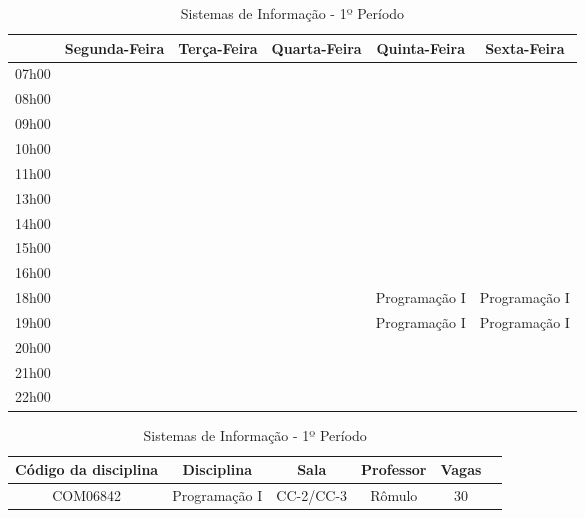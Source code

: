 \begin{apendices}
\begin{table}[!h]
\begin{adjustbox}{width=1\textwidth,center=\textwidth}
\centering
\begin{tabular}{|c|c|c|c|c|c|}
\hline
 & Segunda-Feira & Terça-Feira & Quarta-Feira & Quinta-Feira & Sexta-Feira \\ \hline
07h00 &  &  &  &  &  \\ \hline
08h00 &  &  &  &  &  \\ \hline
09h00 &  &  &  &  &  \\ \hline
10h00 &  &  &  &  &  \\ \hline
11h00 &  &  &  &  &  \\ \hline
13h00 &  &  &  &  &  \\ \hline
14h00 &  &  &  &  &  \\ \hline
15h00 &  &  &  &  &  \\ \hline
16h00 &  &  &  &  &  \\ \hline
18h00 &  &  &  & Programação I & Programação I \\ \hline
19h00 &  &  &  & Programação I & Programação I \\ \hline
20h00 &  &  &  &  &  \\ \hline
21h00 &  &  &  &  &  \\ \hline
22h00 &  &  &  &  &  \\ \hline

\end{tabular}
\end{adjustbox}
\begin{adjustbox}{width=1\textwidth,center=\textwidth}
\centering
\begin{tabular}{|c|c|c|c|c|c|}
\hline
\textbf{Código da disciplina} & \textbf{Disciplina} & \textbf{Sala} & \textbf{Professor} & \textbf{Vagas} \\ \hline
COM06842 & Programação I & CC-2/CC-3 & Rômulo & 30 \\ \hline


\end{tabular}
\end{adjustbox}
\caption{Sistemas de Informação - 1º Período}
\end{table}



\end{apendices}

